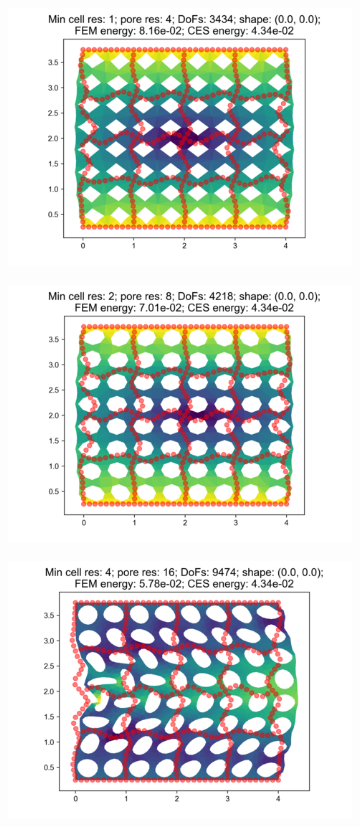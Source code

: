 \begin{figure}[H]
\begin{subfigure}{.45\textwidth}
  \centering
  \includegraphics[width=.8\linewidth]{lces/vis_compression/bm_6_mesh_0.png}
\end{subfigure}
\begin{subfigure}{.45\textwidth}
  \centering
  \includegraphics[width=.8\linewidth]{lces/vis_compression/bm_6_mesh_1.png}
\end{subfigure}
\newline
\begin{subfigure}{.45\textwidth}
  \centering
  \includegraphics[width=.8\linewidth]{lces/vis_compression/bm_6_mesh_2.png}

\end{subfigure}
\end{figure}
